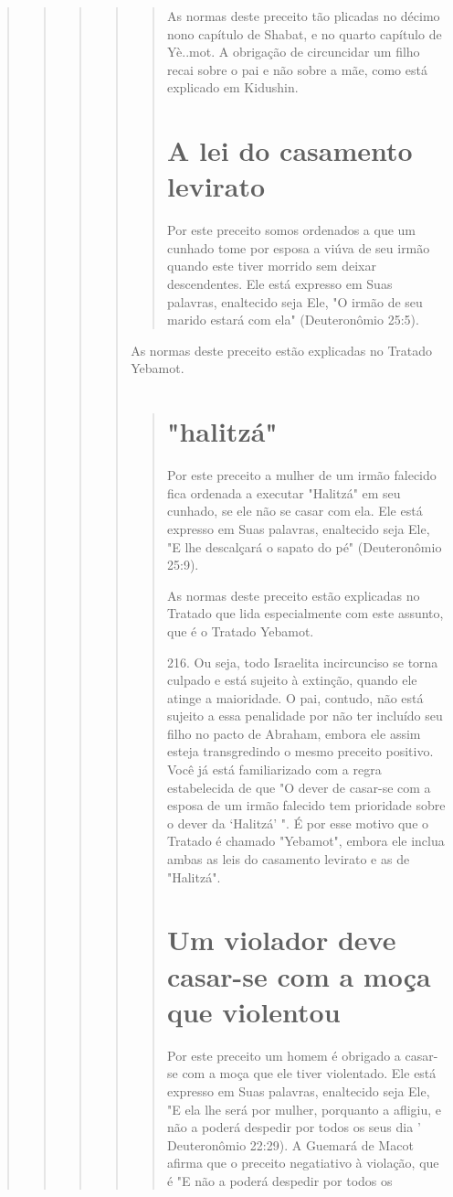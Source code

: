 \begin{quote}
\begin{quote}
\begin{quote}
\begin{quote}
\begin{quote}
As normas deste preceito tão plicadas no décimo nono capítulo de Shabat,
e no quarto capítulo de Yè..mot. A obrigação de circuncidar um filho
recai sobre o pai e não sobre a mãe, como está explicado em Kidushin.

\section{A lei do casamento levirato}

Por este preceito somos ordenados a que um cunhado tome por es­posa a
viúva de seu irmão quando este tiver morrido sem deixar descendentes.
Ele está expresso em Suas palavras, enaltecido seja Ele, "O irmão de seu
mari­do estará com ela" (Deuteronômio 25:5).
\end{quote}

As normas deste preceito estão explicadas no Tratado Yebamot.

\begin{quote}
\section{"halitzá"}

Por este preceito a mulher de um irmão falecido fica ordenada a
exe­cutar "Halitzá" em seu cunhado, se ele não se casar com ela. Ele
está expresso em Suas palavras, enaltecido seja Ele, "E lhe descalçará o
sapato do pé" (Deute­ronômio 25:9).

As normas deste preceito estão explicadas no Tratado que lida
espe­cialmente com este assunto, que é o Tratado Yebamot.

216. Ou seja, todo Israelita incircunciso se torna culpado e está
sujeito à extinção, quando ele atin­ge a maioridade. O pai, contudo, não
está sujeito a essa penalidade por não ter incluído seu filho no pacto
de Abraham, embora ele assim esteja transgredindo o mesmo preceito
positivo.
Você já está familiarizado com a regra estabelecida de que "O dever de
casar-se com a esposa de um irmão falecido tem prioridade sobre o dever
da `Halitzá' ". É por esse motivo que o Tratado é chamado "Yebamot",
embo­ra ele inclua ambas as leis do casamento levirato e as de
"Halitzá".

\section{Um violador deve casar-se com a moça que violentou}

Por este preceito um homem é obrigado a casar-se com a moça que ele
tiver violentado. Ele está expresso em Suas palavras, enaltecido seja
Ele, "E ela lhe será por mulher, porquanto a afligiu, e não a poderá
despedir por todos os seus dia ' Deuteronômio 22:29). A Guemará de Macot
afirma que o precei­to negatiativo à violação, que é "E não a poderá
despedir por todos os


\end{quote}
\end{quote}
\end{quote}
\end{quote}
\end{quote}
